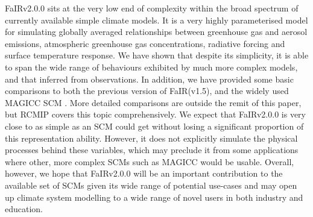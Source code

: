\documentclass[gmd, manuscript]{copernicus}
\begin{document}
%
FaIRv2.0.0 sits at the very low end of complexity within the broad spectrum of currently available simple climate models. It is a very highly parameterised model for simulating globally averaged relationships between greenhouse gas and aerosol emissions, atmospheric greenhouse gas concentrations, radiative forcing and surface temperature response. We have shown that despite its simplicity, it is able to span the wide range of behaviours exhibited by much more complex models, and that inferred from observations. In addition, we have provided some basic comparisons to both the previous version of FaIR(v1.5), and the widely used MAGICC SCM  \citep{Meinshausen2011,Meinshausen2011b,Meinshausen2019}. More detailed comparisons are outside the remit of this paper, but RCMIP \citep{Nicholls2020,Nicholls2019} covers this topic comprehensively. We expect that FaIRv2.0.0 is very close to as simple as an SCM could get without losing a significant proportion of this representation ability.  However, it does not explicitly simulate the physical processes behind these variables, which may preclude it from some applications where other, more complex SCMs such as MAGICC would be usable. Overall, however, we hope that FaIRv2.0.0 will be an important contribution to the available set of SCMs given its wide range of potential use-cases and may open up climate system modelling to a wide range of novel users in both industry and education.











\end{document}
